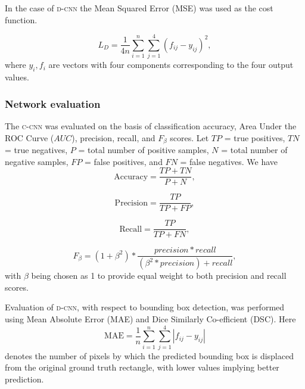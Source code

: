 \documentclass[journal,twocolumn]{IEEEtran}
\begin{document}
In the case of  {\scshape{d-cnn}} the  Mean Squared Error (MSE) was used as the  cost function.

\begin{equation}
L_D = \frac{1}{4n} \sum_{i=1}^{n} \sum_{j=1}^{4}(f_{ij} - y_{ij})^2,
\end{equation}
\noindent where $y_i, f_i$ are vectors with four components corresponding to the four output values.

\subsubsection{Network evaluation}
The {\scshape{c-cnn}}  was evaluated  on the basis of classification accuracy, Area Under the ROC Curve ($AUC$), precision, recall, and $F_{\beta}$ scores. Let $TP$ = true positives, $TN$ = true negatives, $P$ = total number of positive samples, $N$ = total number of negative samples, $FP$ = false positives, and $FN$ = false negatives.
We have
\begin{equation}
\text{Accuracy} = \frac{TP + TN}{P + N},
\label{eq:accuracy}
\end{equation}

\begin{equation}
\text{Precision} = \frac{TP}{TP + FP},
\label{eq:precision}
\end{equation}

\begin{equation}
\text{Recall} = \frac{TP}{TP + FN},
\label{eq:recall}
\end{equation}

\begin{equation}
F_{\beta} = \left( 1 + \beta^2\right) * \frac{precision * recall}{\left( \beta^2 * precision\right) + recall},
\label{eq:beta}
\end{equation}
\noindent with  $\beta$  being chosen as  1 to provide  equal weight to both precision and recall scores.

Evaluation of {\scshape{d-cnn}}, with respect to bounding box detection, was performed using Mean Absolute Error (MAE) and Dice Similarly Co-efficient (DSC). Here
\begin{equation}
\text{MAE} = \frac{1}{n}\sum_{i = 1}^{n} \sum_{j = 1}^{4} |f_{ij} - y_{ij}|
\label{eq:mae}
\end{equation}
 \noindent denotes the number of pixels by which the predicted bounding box is displaced from the original ground truth rectangle, with lower
  values  implying  better prediction.
\end{document}
